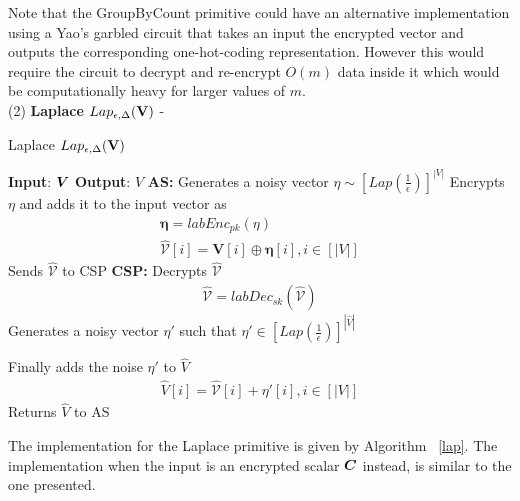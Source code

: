 Note that the \textsf{GroupByCount} primitive could have an alternative implementation using a Yao's garbled circuit that takes an input the encrypted vector and outputs the corresponding one-hot-coding representation. However this would require the circuit to decrypt and re-encrypt $O(m)$ data inside it which would be computationally heavy for larger values of $m$. 
 \\ (2)\textbf{ \textsf{Laplace }}$Lap_{\epsilon,\Delta}(\mathbf{V})$ -  
\begin{algorithm}
\small
\caption{\textsf{Laplace }$Lap_{\epsilon,\Delta}(\mathbf{V})$}
\begin{algorithmic}[1]
\STATEx
\textbf{Input}: $\boldsymbol{V}$
\STATEx \textbf{Output}: $\hat{V}$
\STATEx \textbf{\textsf{AS}:} \STATE Generates a noisy vector $\eta \sim [Lap(\frac{1}{\epsilon})]^{|V|}$ \STATE Encrypts $\eta$ and adds it to the input vector as \begin{gather*}\boldsymbol{\eta}=labEnc_{pk}(\eta)\\
\mathbf{\hat{\mathcal{V}}}[i]=\mathbf{V}[i]\oplus \boldsymbol{\eta}[i], i \in [|V|]\end{gather*}
\STATE Sends $\hat{\mathbb{\mathcal{V}}}$  to \textsf{CSP}
\STATEx \textbf{\textsf{CSP}:}
\STATE Decrypts $\mathbf{\hat{\mathcal{V}}}$ \begin{gather*}\hat{\mathcal{V}}=labDec_{sk}(\mathbf{\hat{\mathcal{V}}})\end{gather*}
\STATE Generates a noisy vector $\eta'$ such that $\eta' \in [Lap(\frac{1}{\epsilon})]^{|\hat{V}|}$ \item Finally adds the noise $\eta'$ to $\hat{V}$ \begin{gather*}\hat{V}[i]=\hat{\mathcal{V}}[i]+\eta'[i], i \in [|V|]\end{gather*}
\STATE Returns $\hat{V}$ to \textsf{AS}
 \end{algorithmic} \label{lap}
\end{algorithm} The implementation for the \textsf{Laplace} primitive is given by Algorithm ~\ref{lap}. The implementation when the input is an encrypted scalar $\boldsymbol{C}$ instead, is similar to the one presented.

